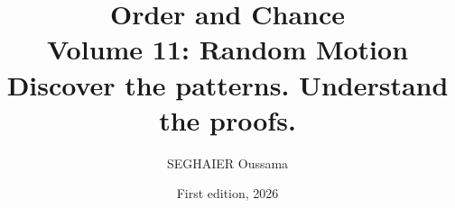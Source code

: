 \documentclass[11pt,openany]{book}
\title{\Huge\textbf{Order and Chance}\\[0.4em]\LARGE Volume 11: Random Motion\\[0.6em]
\Large Discover the patterns. Understand the proofs.}
\author{SEGHAIER Oussama}
\date{First edition, 2026}
\begin{document}
\frontmatter
\makecover
\maketitle

\tableofcontents

\mainmatter














\appendix


\end{document}
